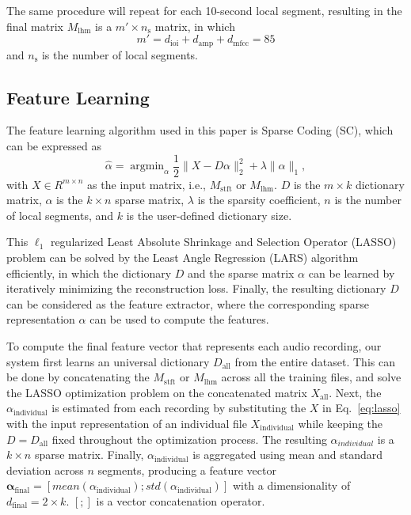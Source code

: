 \documentclass[conference]{IEEEtran}
\begin{document}
The same procedure will repeat for each 10-second local segment, resulting in the final matrix $M_\mathrm{lhm}$ is a $m' \times n_\mathrm{s}$ matrix,  in which 
\begin{equation}
    m' = d_\mathrm{ioi} + d_\mathrm{amp} + d_\mathrm{mfcc} = 85
\end{equation}%
and $n_\mathrm{s}$ is the number of local segments.


\subsection{Feature Learning}\label{subsec:feat_learn}
The feature learning algorithm used in this paper is Sparse Coding (SC), which can be expressed as %
\begin{equation}\label{eq:lasso}
\hat{\alpha} = \mathop{\mathrm{argmin}}_\alpha \frac{1}{2} \| X - D\alpha \|_{2}^{2} + \lambda \| \alpha \|_{1}, 
\end{equation}
%
with $X \in R^{ m \times n}$ as the input matrix, i.e., $M_\mathrm{stft}$ or $M_\mathrm{lhm}$. $D$ is the $m \times k$ dictionary matrix, $\alpha$ is the $k \times n$ sparse matrix, $\lambda$ is the sparsity coefficient, $n$ is the number of local segments, and $k$ is the user-defined dictionary size. 

This $\ell_1$ regularized Least Absolute Shrinkage and Selection Operator (LASSO) problem can be solved by the Least Angle Regression (LARS) algorithm efficiently\cite{Efron2004}, in which the dictionary $D$ and the sparse matrix $\alpha$ can be learned by iteratively minimizing the reconstruction loss. Finally, the resulting dictionary $D$ can be considered as the feature extractor, where the corresponding sparse representation $\alpha$ can be used to compute the features. 

To compute the final feature vector that represents each audio recording, our system first learns an universal dictionary $D_\mathrm{all}$ from the entire dataset. This can be done by concatenating the $M_\mathrm{stft}$ or $M_\mathrm{lhm}$ across all the training files, and solve the LASSO optimization problem on the concatenated matrix $X_\mathrm{all}$. %
Next, the $\alpha_\mathrm{individual}$ is estimated from each recording by substituting the $X$ in Eq.~\ref{eq:lasso} with the input representation of an individual file $X_\mathrm{individual}$ while keeping the $D = D_\mathrm{all}$ fixed throughout the optimization process. The resulting $\alpha_{individual}$ is a $k \times n$ sparse matrix. Finally, $\alpha_\mathrm{individual}$ is aggregated using mean and standard deviation across $n$ segments, producing a feature vector $\mathbf{\alpha_\mathrm{final}} = [mean(\alpha_\mathrm{individual}); std(\alpha_\mathrm{individual})]$ with a dimensionality of $d_\mathrm{final} = 2 \times k$. $[ ; ]$ is a vector concatenation operator.
\end{document}
